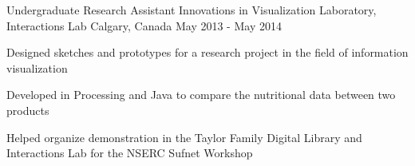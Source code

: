 \begin{cventries}
{    }
  \cventry
    {Undergraduate Research Assistant}
    {Innovations in Visualization Laboratory, Interactions Lab}
    {Calgary, Canada}
    {May 2013 - May 2014}
    {
      \begin{cvitems}
        \item {Designed sketches and prototypes for a research project in the field of information visualization}
        \item {Developed in Processing and Java to compare the nutritional data between two products}
        \item {Helped organize demonstration in the Taylor Family Digital Library and Interactions Lab for the NSERC Sufnet Workshop}
      \end{cvitems}
    }
\end{cventries}

